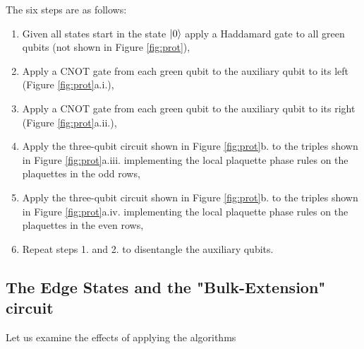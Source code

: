 \documentclass[a4paper,twocolumn,11pt]{quantumarticle}
\begin{document}
The six steps are as follows:\begin{enumerate}
\item Given all states start in the state $\ket{0}$ apply a Haddamard gate to all green qubits (not shown in Figure \ref{fig:prot}),
\item Apply a CNOT gate from each green qubit to the auxiliary qubit to its left (Figure \ref{fig:prot}a.i.),
\item Apply a CNOT gate from each green qubit to the auxiliary qubit to its right (Figure \ref{fig:prot}a.ii.),
\item Apply the three-qubit circuit shown in Figure \ref{fig:prot}b. to the triples shown in Figure \ref{fig:prot}a.iii. implementing the local plaquette phase rules on the plaquettes in the odd rows,
\item Apply the three-qubit circuit shown in Figure \ref{fig:prot}b. to the triples shown in Figure \ref{fig:prot}a.iv. implementing the local plaquette phase rules on the plaquettes in the even rows,
\item Repeat steps 1. and 2. to disentangle the auxiliary qubits.
\end{enumerate}


\subsection{The Edge States and the "Bulk-Extension" circuit}

Let us examine the effects of applying the algorithms 




\end{document}
